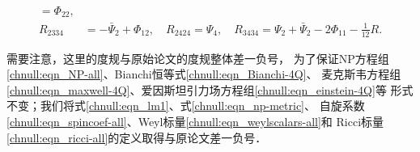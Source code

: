 \begin{equation}
\begin{aligned}
        =  \Phi_{22},   \\
        R_{2334} %
        &= -\bar{\Psi}_{2} + \Phi_{12},  \quad
        R_{2424} %
        = \Psi_{4} ,  \quad
        R_{3434} %
        = \Psi_{2} + \bar{\Psi}_2  -2\Phi_{11}- \frac{1}{12} R   .
    \end{aligned}
\end{equation} %



需要注意，这里的度规与原始论文的度规\cite{newman-Penrose-1962}整体差一负号，
为了保证NP方程组\eqref{chnull:eqn_NP-all}、Bianchi恒等式\eqref{chnull:eqn_Bianchi-4Q}、
麦克斯韦方程组\eqref{chnull:eqn_maxwell-4Q}、爱因斯坦引力场方程组\eqref{chnull:eqn_einstein-4Q}等
形式不变；我们将式\eqref{chnull:eqn_lm1}、式\eqref{chnull:eqn_np-metric}、
自旋系数\eqref{chnull:eqn_spincoef-all}、Weyl标量\eqref{chnull:eqn_weylscalars-all}和
Ricci标量\eqref{chnull:eqn_ricci-all}的定义取得与原论文\cite{newman-Penrose-1962}差一负号．

